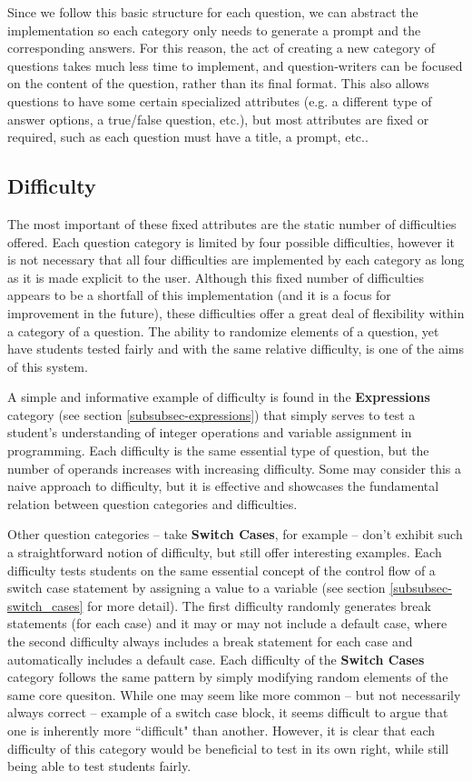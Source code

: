 \documentclass{article}
\begin{document}
Since we follow this basic structure for each question, we can abstract the implementation so each category
only needs to generate a prompt and the corresponding answers. For this reason, the act of creating a new
category of questions takes much less time to implement, and question-writers can be focused on the content of
the question, rather than its final format. This also allows questions to have some certain specialized attributes
(e.g. a different type of answer options, a true/false question, etc.), but most attributes are fixed or required, such as each question
must have a title, a prompt, etc..

\subsection{Difficulty} \label{sec-difficulty}

The most important of these fixed attributes are the static number of difficulties offered. Each question category is
limited by four possible difficulties, however it is not necessary that all four difficulties are implemented by each category
as long as it is made explicit to the user. Although this fixed number of difficulties appears to be a shortfall of this
implementation (and it is a focus for improvement in the future), these difficulties offer a great deal of flexibility
within a category of a question. The ability to randomize elements of a question, yet have students tested fairly and with the same relative difficulty, is one of the aims of this system. 

A simple and informative example of difficulty is found in the \textbf{Expressions} category (see section \ref{subsubsec-expressions})
that simply serves to test a student's understanding of integer operations and variable assignment in programming.
Each difficulty is the same essential type of question, but the number of operands increases with increasing difficulty.
Some may consider this a naive approach to difficulty, but it is effective and showcases the fundamental relation
between question categories and difficulties.

Other question categories -- take \textbf{Switch Cases}, for example -- don't exhibit such a straightforward
notion of difficulty, but still offer interesting examples. Each difficulty tests students on the same essential concept of
the control flow of a switch case statement by assigning a value to a variable (see section \ref{subsubsec-switch_cases} for more detail).
The first difficulty randomly generates break statements (for each case) and it may or may not include a default case, where the second difficulty
always includes a break statement for each case and automatically includes a default case. Each difficulty of the \textbf{Switch Cases} category follows the
same pattern by simply modifying random elements of the same core quesiton. While one may seem like more common -- but not necessarily always
correct -- example of a switch case block, it seems difficult to argue that one is inherently more ``difficult" than another. However, it is clear
that each difficulty of this category would be beneficial to test in its own right, while still being able to test students fairly.
\end{document}
